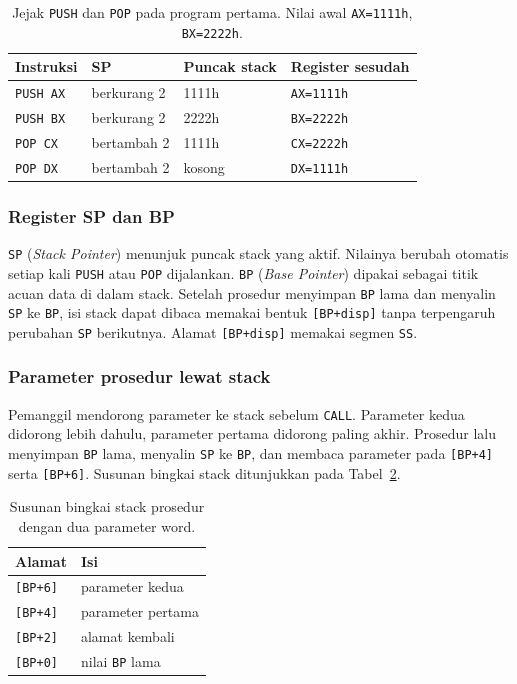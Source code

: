 \begin{table}[H]
    \centering
    \caption{Jejak \texttt{PUSH} dan \texttt{POP} pada program
    pertama. Nilai awal \texttt{AX=1111h}, \texttt{BX=2222h}.}
    \label{tab:m08-lifo}
    \small
    \begin{tabular}{@{}llll@{}}
        \toprule
        \textbf{Instruksi} & \textbf{SP} & \textbf{Puncak stack} &
        \textbf{Register sesudah} \\
        \midrule
        \texttt{PUSH AX} & berkurang 2 & 1111h & \texttt{AX=1111h} \\
        \texttt{PUSH BX} & berkurang 2 & 2222h & \texttt{BX=2222h} \\
        \texttt{POP CX} & bertambah 2 & 1111h & \texttt{CX=2222h} \\
        \texttt{POP DX} & bertambah 2 & kosong & \texttt{DX=1111h} \\
        \bottomrule
    \end{tabular}
\end{table}

\subsubsection*{Register SP dan BP}

\texttt{SP} (\emph{Stack Pointer}) menunjuk puncak stack yang aktif.
Nilainya berubah otomatis setiap kali \texttt{PUSH} atau \texttt{POP}
dijalankan. \texttt{BP} (\emph{Base Pointer}) dipakai sebagai titik
acuan data di dalam stack. Setelah prosedur menyimpan \texttt{BP} lama
dan menyalin \texttt{SP} ke \texttt{BP}, isi stack dapat dibaca
memakai bentuk \texttt{[BP+disp]} tanpa terpengaruh perubahan
\texttt{SP} berikutnya. Alamat \texttt{[BP+disp]} memakai segmen
\texttt{SS}.

\subsubsection*{Parameter prosedur lewat stack}

Pemanggil mendorong parameter ke stack sebelum \texttt{CALL}.
Parameter kedua didorong lebih dahulu, parameter pertama didorong
paling akhir. Prosedur lalu menyimpan \texttt{BP} lama, menyalin
\texttt{SP} ke \texttt{BP}, dan membaca parameter pada
\texttt{[BP+4]} serta \texttt{[BP+6]}. Susunan bingkai stack
ditunjukkan pada Tabel~\ref{tab:m08-frame}.

\begin{table}[H]
    \centering
    \caption{Susunan bingkai stack prosedur dengan dua parameter word.}
    \label{tab:m08-frame}
    \small
    \begin{tabular}{@{}ll@{}}
        \toprule
        \textbf{Alamat} & \textbf{Isi} \\
        \midrule
        \texttt{[BP+6]} & parameter kedua \\
        \texttt{[BP+4]} & parameter pertama \\
        \texttt{[BP+2]} & alamat kembali \\
        \texttt{[BP+0]} & nilai \texttt{BP} lama \\
        \bottomrule
    \end{tabular}
\end{table}

